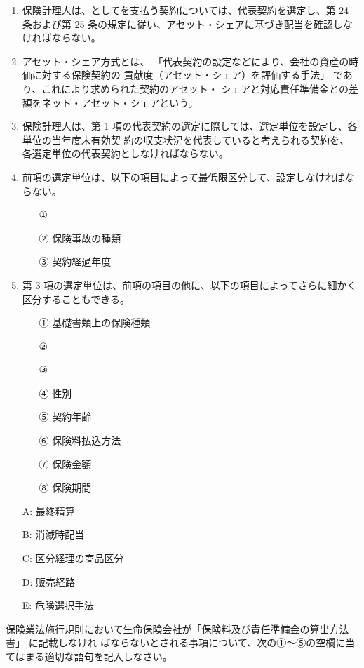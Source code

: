 \documentclass[report,gutter=10mm,fore-edge=10mm,uplatex,dvipdfmx]{jlreq}
\begin{document}
\begin{enumerate}
 \item 保険計理人は、としてを支払う契約については、代表契約を選定し、第 24 条および第 25 条の規定に従い、アセット・シェアに基づき配当を確認しなければならない。
 \item 
アセット・シェア方式とは、
「代表契約の設定などにより、会社の資産の時価に対する保険契約の
貢献度（アセット・シェア）を評価する手法」 であり、これにより求められた契約のアセット・
シェアと対応責任準備金との差額をネット・アセット・シェアという。
 \item 
保険計理人は、第 1 項の代表契約の選定に際しては、選定単位を設定し、各単位の当年度末有効契
約の収支状況を代表していると考えられる契約を、各選定単位の代表契約としなければならない。
 \item 
前項の選定単位は、以下の項目によって最低限区分して、設定しなければならない。
\begin{itemize}
 \item [①] 
 \item [②] 保険事故の種類
 \item [③] 契約経過年度
\end{itemize}
 \item 
第 3 項の選定単位は、前項の項目の他に、以下の項目によってさらに細かく区分することもできる。
\begin{itemize}
 \item [①]  基礎書類上の保険種類
 \item [②] 
\item [③] 
\item [④]  性別
\item [⑤]  契約年齢
\item [⑥]  保険料払込方法
\item [⑦]  保険金額
\item [⑧]  保険期間
\end{itemize}
\end{enumerate}
\answer{}

\begin{itemize}
\item [A: ] 最終精算
\item [B: ] 消滅時配当
\item [C: ] 区分経理の商品区分
\item [D: ] 販売経路
\item [E: ] 危険選択手法
\end{itemize}

保険業法施行規則において生命保険会社が「保険料及び責任準備金の算出方法書」 に記載しなけれ
ばならないとされる事項について、次の①～⑤の空欄に当てはまる適切な語句を記入しなさい。
\end{document}
